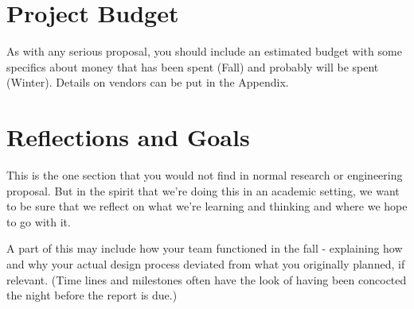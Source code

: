 \section{Project Budget}
As with any serious proposal, you should include an estimated budget with some specifics about money that has been spent (Fall) and probably will be spent (Winter). Details on vendors can be put in the Appendix.

\section{Reflections and Goals}
This is the one section that you would not find in normal research or engineering proposal. But in the spirit that we're doing this in an academic setting, we want to be sure that we reflect on what we're learning and thinking and where we hope to go with it.

A part of this may include how your team functioned in the fall - explaining how and why your actual design process deviated from what you originally planned, if relevant. (Time lines and milestones often have the look of having been concocted the night before the report is due.)
